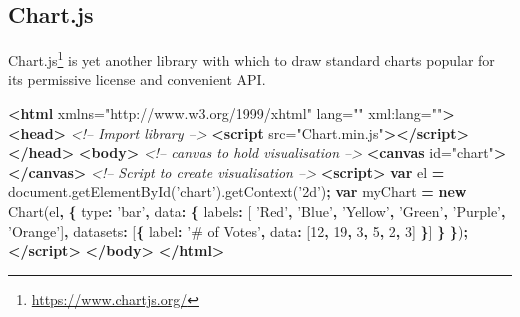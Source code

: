 \documentclass[10pt,]{krantz}
\makeatletter
\newenvironment{Shaded}{\begin{snugshade}}{\end{snugshade}}
\newcommand{\AttributeTok}[1]{\textcolor[rgb]{0.61,0.61,0.61}{#1}}
\newcommand{\CommentTok}[1]{\textcolor[rgb]{0.37,0.37,0.37}{\textit{#1}}}
\newcommand{\DataTypeTok}[1]{\textcolor[rgb]{0.27,0.27,0.27}{#1}}
\newcommand{\DecValTok}[1]{\textcolor[rgb]{0.06,0.06,0.06}{#1}}
\newcommand{\KeywordTok}[1]{\textcolor[rgb]{0.27,0.27,0.27}{\textbf{#1}}}
\newcommand{\NormalTok}[1]{#1}
\newcommand{\OperatorTok}[1]{\textcolor[rgb]{0.43,0.43,0.43}{\textbf{#1}}}
\newcommand{\OtherTok}[1]{\textcolor[rgb]{0.37,0.37,0.37}{#1}}
\newcommand{\StringTok}[1]{\textcolor[rgb]{0.5,0.5,0.5}{#1}}
\newcommand{\VariableTok}[1]{\textcolor[rgb]{0,0,0}{#1}}
\renewcommand{\href}[2]{#2\footnote{\url{#1}}}
\newenvironment{kframe}{%
\medskip{}
\setlength{\fboxsep}{.8em}
 \def\at@end@of@kframe{}%
 \ifinner\ifhmode%
  \def\at@end@of@kframe{\end{minipage}}%
  \begin{minipage}{\columnwidth}%
 \fi\fi%
 \def\FrameCommand##1{\hskip\@totalleftmargin \hskip-\fboxsep
 \colorbox{shadecolor}{##1}\hskip-\fboxsep
     \hskip-\linewidth \hskip-\@totalleftmargin \hskip\columnwidth}%
 \MakeFramed {\advance\hsize-\width
   \@totalleftmargin\z@ \linewidth\hsize
   \@setminipage}}%
 {\par\unskip\endMakeFramed%
 \at@end@of@kframe}
\renewenvironment{Shaded}{\begin{kframe}}{\end{kframe}}
\makeatother
\begin{document}
\hypertarget{widgets-basics-candidates-chart.js}{%
\subsection{Chart.js}\label{widgets-basics-candidates-chart.js}}

\href{https://www.chartjs.org/}{Chart.js} is yet another library with which to draw standard charts popular for its permissive license and convenient API.

\begin{Shaded}
\begin{Highlighting}[]
\KeywordTok{<html}\OtherTok{ xmlns=}\StringTok{"http://www.w3.org/1999/xhtml"}\OtherTok{ lang=}\StringTok{""}\OtherTok{ xml:lang=}\StringTok{""}\KeywordTok{>}
\KeywordTok{<head>}
  \CommentTok{<!-- Import library -->}
  \KeywordTok{<script}\OtherTok{ src=}\StringTok{"Chart.min.js"}\KeywordTok{></script>}
\KeywordTok{</head>}
\KeywordTok{<body>}
  \CommentTok{<!-- canvas to hold visualisation -->}
  \KeywordTok{<canvas}\OtherTok{ id=}\StringTok{"chart"}\KeywordTok{></canvas>}
  \CommentTok{<!-- Script to create visualisation -->}
  \KeywordTok{<script>}
    \KeywordTok{var}\NormalTok{ el }\OperatorTok{=} \VariableTok{document}\NormalTok{.}\AttributeTok{getElementById}\NormalTok{(}\StringTok{'chart'}\NormalTok{).}\AttributeTok{getContext}\NormalTok{(}\StringTok{'2d'}\NormalTok{)}\OperatorTok{;}    
    \KeywordTok{var}\NormalTok{ myChart }\OperatorTok{=} \KeywordTok{new} \AttributeTok{Chart}\NormalTok{(el}\OperatorTok{,} \OperatorTok{\{}
      \DataTypeTok{type}\OperatorTok{:} \StringTok{'bar'}\OperatorTok{,}
      \DataTypeTok{data}\OperatorTok{:} \OperatorTok{\{}
        \DataTypeTok{labels}\OperatorTok{:}\NormalTok{ [}
          \StringTok{'Red'}\OperatorTok{,} \StringTok{'Blue'}\OperatorTok{,} \StringTok{'Yellow'}\OperatorTok{,} \StringTok{'Green'}\OperatorTok{,} 
          \StringTok{'Purple'}\OperatorTok{,} \StringTok{'Orange'}\NormalTok{]}\OperatorTok{,}
        \DataTypeTok{datasets}\OperatorTok{:}\NormalTok{ [}\OperatorTok{\{}
          \DataTypeTok{label}\OperatorTok{:} \StringTok{'# of Votes'}\OperatorTok{,}
          \DataTypeTok{data}\OperatorTok{:}\NormalTok{ [}\DecValTok{12}\OperatorTok{,} \DecValTok{19}\OperatorTok{,} \DecValTok{3}\OperatorTok{,} \DecValTok{5}\OperatorTok{,} \DecValTok{2}\OperatorTok{,} \DecValTok{3}\NormalTok{]}
        \OperatorTok{\}}\NormalTok{]}
      \OperatorTok{\}}
    \OperatorTok{\}}\NormalTok{)}\OperatorTok{;}
  \KeywordTok{</script>}
\KeywordTok{</body>}
\KeywordTok{</html>}
\end{Highlighting}
\end{Shaded}
\end{document}
